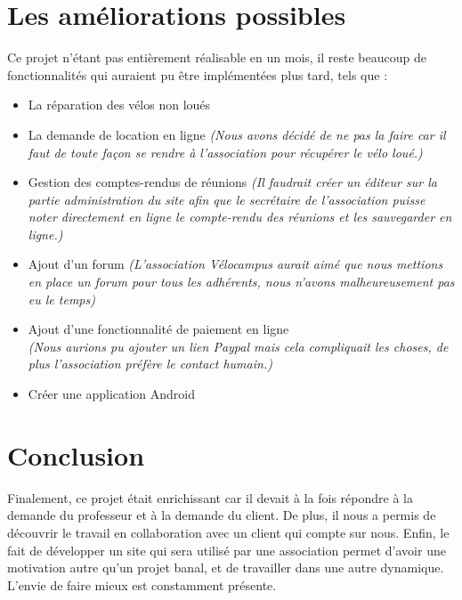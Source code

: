 \documentclass[11pt,a4paper,titlepage]{report}
\begin{document}
\chapter{Les améliorations possibles}
Ce projet n'étant pas entièrement réalisable en un mois, il reste beaucoup de fonctionnalités qui auraient pu être implémentées plus tard, tels que : \\
\begin{itemize}
\item La réparation des vélos non loués 
\item La demande de location en ligne 
\textit{(Nous avons décidé de ne pas la faire car il faut de toute façon se rendre à l'association pour récupérer le vélo loué.)}
\item Gestion des comptes-rendus de réunions  \textit{(Il faudrait créer un éditeur sur la partie administration du site afin que le secrétaire de l'association puisse noter directement en ligne le compte-rendu des réunions et les sauvegarder en ligne.)} 
\item Ajout d'un forum 
\textit{(L'association Vélocampus aurait aimé que nous mettions en place un forum pour tous les adhérents, nous n'avons malheureusement pas eu le temps)} 
\item Ajout d'une fonctionnalité de paiement en ligne \\
\textit{(Nous aurions pu ajouter un lien Paypal mais cela compliquait les choses, de plus l'association préfère le contact humain.)} 
\item Créer une application Android
\end{itemize}

\chapter*{Conclusion}
Finalement, ce projet était enrichissant car il devait à la fois répondre à la demande du professeur et à la demande du client. 
De plus, il nous a permis de découvrir le travail en collaboration avec un client qui compte sur nous. 
Enfin, le fait de développer un site qui sera utilisé par une association permet d'avoir une motivation autre qu'un projet banal, et de travailler dans une autre dynamique. L'envie de faire mieux est constamment présente.
\end{document}
